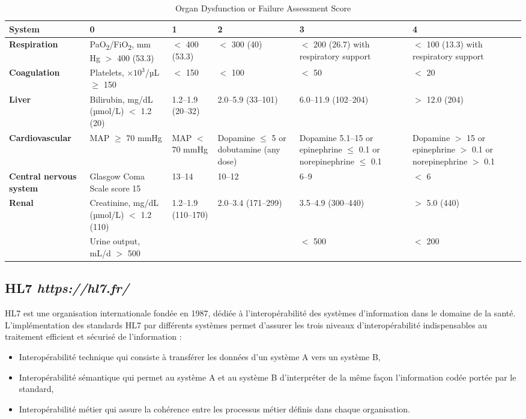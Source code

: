 \documentclass[a4paper,12pt]{article}
\begin{document}
\begin{table}[htbp]
\centering
\caption{\normalsize{Organ Dysfunction or Failure Assessment Score}}
\label{tab:score_sofa}
\begin{tabularx}{\textwidth}{|p{3cm}|X|X|X|X|X|}
\hline
\textbf{System} & \textbf{0} & \textbf{1} & \textbf{2} & \textbf{3} & \textbf{4} \\
\hline
\textbf{Respiration} & PaO\textsubscript{2}/FiO\textsubscript{2}, mm Hg $>$ 400 (53.3) & $<$ 400 (53.3) & $<$ 300 (40) & $<$ 200 (26.7) with respiratory support & $<$ 100 (13.3) with respiratory support \\
\hline
\textbf{Coagulation} & Platelets, $\times 10^3$/µL $\geq$ 150 & $<$ 150 & $<$ 100 & $<$ 50 & $<$ 20 \\
\hline
\textbf{Liver} & Bilirubin, mg/dL (µmol/L) $<$ 1.2 (20) & 1.2–1.9 (20–32) & 2.0–5.9 (33–101) & 6.0–11.9 (102–204) & $>$ 12.0 (204) \\
\hline
\textbf{Cardiovascular} & MAP $\geq$ 70 mmHg & MAP $<$ 70 mmHg & Dopamine $\leq$ 5 or dobutamine (any dose) & Dopamine 5.1–15 or epinephrine $\leq$ 0.1 or norepinephrine $\leq$ 0.1 & Dopamine $>$ 15 or epinephrine $>$ 0.1 or norepinephrine $>$ 0.1 \\
\hline
\textbf{Central nervous system} & Glasgow Coma Scale score 15 & 13–14 & 10–12 & 6–9 & $<$ 6 \\
\hline
\textbf{Renal} & Creatinine, mg/dL (µmol/L) $<$ 1.2 (110) & 1.2–1.9 (110–170) & 2.0–3.4 (171–299) & 3.5–4.9 (300–440) & $>$ 5.0 (440) \\
& Urine output, mL/d $>$ 500 & & & $<$ 500 & $<$ 200 \\
\hline
\end{tabularx}
\end{table}


\subsection{HL7 \textit{https://hl7.fr/}}
HL7 est une organisation internationale fondée en 1987, dédiée à l’interopérabilité des systèmes d’information dans le domaine de la santé.
L’implémentation des standards HL7 par différents systèmes permet d’assurer les trois niveaux d’interopérabilité indispensables au traitement efficient et sécurisé de l’information :
\begin{itemize}
    \setlength{\itemsep}{1pt} %
    \item Interopérabilité technique qui consiste à transférer les données d’un système A vers un système B,
    \item Interopérabilité sémantique qui permet au système A et au système B d’interpréter de la même façon l’information codée portée par le standard,
    \item Interopérabilité métier qui assure la cohérence entre les processus métier définis dans chaque organisation.
\end{itemize}
\end{document}
